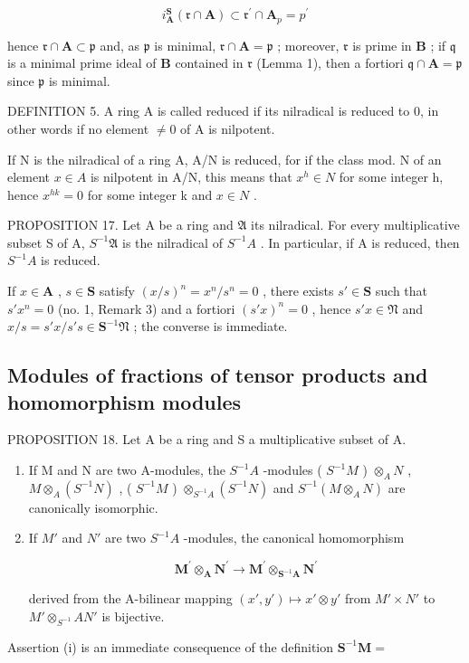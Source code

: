 \[
i _ {\mathbf {A}} ^ {\mathbf {S}} (\mathfrak {r} \cap \mathbf {A}) \subset \mathfrak {r} ^ {\prime} \cap \mathbf {A} _ {p} = p ^ {\prime}
\]

hence \(\mathfrak{r} \cap \mathbf{A} \subset \mathfrak{p}\) and, as \(\mathfrak{p}\) is minimal, \(\mathfrak{r} \cap \mathbf{A} = \mathfrak{p}\) ; moreover, \(\mathfrak{r}\) is prime in \(\mathbf{B}\) ; if \(\mathfrak{q}\) is a minimal prime ideal of \(\mathbf{B}\) contained in \(\mathfrak{r}\) (Lemma 1), then a fortiori \(\mathfrak{q} \cap \mathbf{A} = \mathfrak{p}\) since \(\mathfrak{p}\) is minimal.

DEFINITION 5. A ring A is called reduced if its nilradical is reduced to 0, in other words if no element \(\neq 0\) of A is nilpotent.

If N is the nilradical of a ring A, A/N is reduced, for if the class mod. N of an element \(x \in A\) is nilpotent in A/N, this means that \(x^{h} \in N\) for some integer h, hence \(x^{hk} = 0\) for some integer k and \(x \in N\) .

PROPOSITION 17. Let A be a ring and \(\mathfrak{A}\) its nilradical. For every multiplicative subset S of A, \(S^{-1}\mathfrak{A}\) is the nilradical of \(S^{-1}A\) . In particular, if A is reduced, then \(S^{-1}A\) is reduced.

If \(x \in \mathbf{A}\) , \(s \in \mathbf{S}\) satisfy \((x / s)^n = x^n / s^n = 0\) , there exists \(s' \in \mathbf{S}\) such that \(s' x^n = 0\) (no. 1, Remark 3) and a fortiori \((s' x)^n = 0\) , hence \(s' x \in \mathfrak{N}\) and \(x / s = s' x / s' s \in \mathbf{S}^{-1} \mathfrak{N}\) ; the converse is immediate.

\subsection{Modules of fractions of tensor products and homomorphism modules}

PROPOSITION 18. Let A be a ring and S a multiplicative subset of A.

\begin{enumerate}
\def\labelenumi{(\roman{enumi})}
\tightlist
\item
  If M and N are two A-modules, the \(S^{-1}A\) -modules ( \(S^{-1}M\) ) \(\otimes_{A}N\) , \(M\otimes_{A}(S^{-1}N)\) , ( \(S^{-1}M\) ) \(\otimes_{S^{-1}A}(S^{-1}N)\) and \(S^{-1}(M\otimes_{A}N)\) are canonically isomorphic.
\item
  If \(M'\) and \(N'\) are two \(S^{-1}A\) -modules, the canonical homomorphism

\[
\mathbf {M} ^ {\prime} \otimes_ {\mathbf {A}} \mathbf {N} ^ {\prime} \rightarrow \mathbf {M} ^ {\prime} \otimes_ {\mathbf {S} ^ {- 1} \mathbf {A}} \mathbf {N} ^ {\prime}
\]

derived from the A-bilinear mapping \((x', y') \mapsto x' \otimes y'\) from \(M' \times N'\) to \(M' \otimes_{S^{-1}} A N'\) is bijective.

\end{enumerate}
Assertion (i) is an immediate consequence of the definition \(\mathbf{S}^{-1}\mathbf{M} =\)

